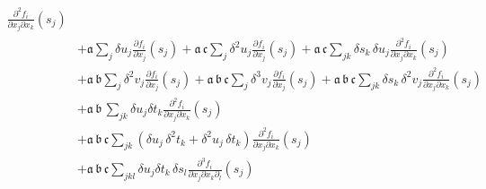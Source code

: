 \begin{align*}
\frac{ \partial^{2} f_{i} }{ \partial x_{j} \partial x_{k} } \! \left( s_{j} \right)
\\
&+ 
\mathfrak{a} \sum_{j} \delta u_{j} \frac{ \partial f_{i} }{ \partial x_{j} } \! \left( s_{j} \right)
+ \mathfrak{a} \, \mathfrak{c} \sum_{j} \delta^{2} u_{j} 
\frac{ \partial f_{i} }{ \partial x_{j} } \! \left( s_{j} \right) 
+ \mathfrak{a} \, \mathfrak{c} \sum_{jk} \delta s_{k} \, \delta u_{j} 
\frac{ \partial^{2} f_{i} }{ \partial x_{j} \partial x_{k} } \! \left( s_{j} \right)
\\
&+ 
\mathfrak{a} \, \mathfrak{b} \sum_{j} \delta^{2} v_{j} 
\frac{ \partial f_{i} }{ \partial x_{j} } \! \left( s_{j} \right)
+ \mathfrak{a} \, \mathfrak{b} \, \mathfrak{c} \sum_{j} \delta^{3} v_{j} 
\frac{ \partial f_{i} }{ \partial x_{j} } \! \left( s_{j} \right) 
+ \mathfrak{a} \, \mathfrak{b} \, \mathfrak{c} \sum_{jk} \delta s_{k} \, \delta^{2} v_{j} 
\frac{ \partial^{2} f_{i} }{ \partial x_{j} \partial x_{k} } \! \left( s_{j} \right)
\\
&+ 
\mathfrak{a} \, \mathfrak{b} \, \sum_{jk} 
\delta u_{j} \delta t_{k} \frac{ \partial^{2} f_{i} }{ \partial x_{j} \partial x_{k} } \! \left( s_{j} \right)
\\
&+ \mathfrak{a} \, \mathfrak{b} \, \mathfrak{c} \sum_{jk}
\left( \delta u_{j} \, \delta^{2} t_{k} + \delta^{2} u_{j} \, \delta t_{k}  \right)
\frac{ \partial^{2} f_{i} }{ \partial x_{j} \partial x_{k} } \! \left( s_{j} \right) 
\\
&+
\mathfrak{a} \, \mathfrak{b} \, \mathfrak{c} \sum_{jkl}
\delta u_{j} \delta t_{k} \, \delta s_{l} 
\frac{ \partial^{3} f_{i} }{ \partial x_{j} \partial x_{k} \partial_{l} } \! \left( s_{j} \right)
\\
%
\end{align*}

